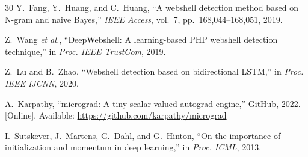 \documentclass[10pt,conference,letterpaper]{IEEEtran}
\begin{document}
\begin{thebibliography}{30}
Y.~Fang, Y.~Huang, and C.~Huang, ``A webshell detection method based on
N-gram and naive Bayes,'' \emph{IEEE Access}, vol.~7, pp.~168,044--168,051,
2019.

Z.~Wang \emph{et al.}, ``DeepWebshell: A learning-based PHP webshell detection
technique,'' in \emph{Proc. IEEE TrustCom}, 2019.

Z.~Lu and B.~Zhao, ``Webshell detection based on bidirectional LSTM,'' in
\emph{Proc. IEEE IJCNN}, 2020.

A.~Karpathy, ``micrograd: A tiny scalar-valued autograd engine,'' GitHub,
2022. [Online]. Available: \url{https://github.com/karpathy/micrograd}

I.~Sutskever, J.~Martens, G.~Dahl, and G.~Hinton, ``On the importance of
initialization and momentum in deep learning,'' in \emph{Proc. ICML}, 2013.

\end{thebibliography}
\end{document}
